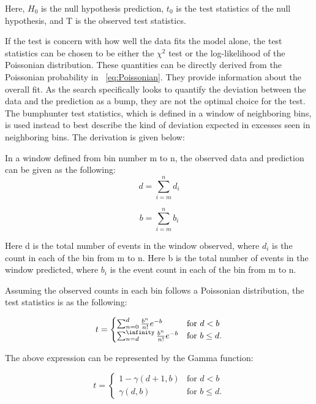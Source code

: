 Here, $H_0$ is the null hypothesis prediction, $t_0$ is the test statistics of the null hypothesis, and T is the observed test statistics.


If the test is concern with how well the data fits the model alone, the test statistics can be chosen to be either the $\chi^{2}$ test or the log-likelihood of the Poissonian distribution. These quantities can be directly derived from the Poissonian probability in ~\ref{eq:Poissonian}. They provide information about the overall fit. As the search specifically looks to quantify the deviation between the data and the prediction as a bump, they are not the optimal choice for the test. 
The bumphunter test statistics, which is defined in a window of neighboring bins, is used instead to best describe the kind of deviation expected in excesses seen in neighboring bins. The derivation is given below: 

In a window defined from bin number m to n, the observed data and prediction can be given as the following: 
    \begin{equation}
         d= \sum_{i=m}^{n} d_i 
    \end{equation}

    
    \begin{equation}
         b= \sum_{i=m}^{n} b_i
    \end{equation}

    Here d is the total number of events in the window observed, where $d_i$ is the count in each of the bin from m to n. 
    Here b is the total number of events in the window predicted, where $b_i$ is the event count in each of the bin from m to n.
    
    Assuming the observed counts in each bin follows a Poissonian distribution, the test statistics is as the following:

	\begin{equation}
    t=
	\begin{cases} \sum_{n=0}^{d} \frac{b^{n}}{n!} e^{-b} & \text{for $d < b$}
    \\
    \sum_{n=d}^{\infinity} \frac{b^n}{n!} e^{-b} & \text{for $b \leq d$}.
    \end{cases}
    \end{equation}

    The above expression can be represented by the Gamma function: 

	\begin{equation}
    t=
	\begin{cases} 1-\gamma(d+1, b) & \text{for $d < b$}
    \\
    \gamma(d,b)  & \text{for $b \leq d$}.
    \end{cases}
    \end{equation}
    


